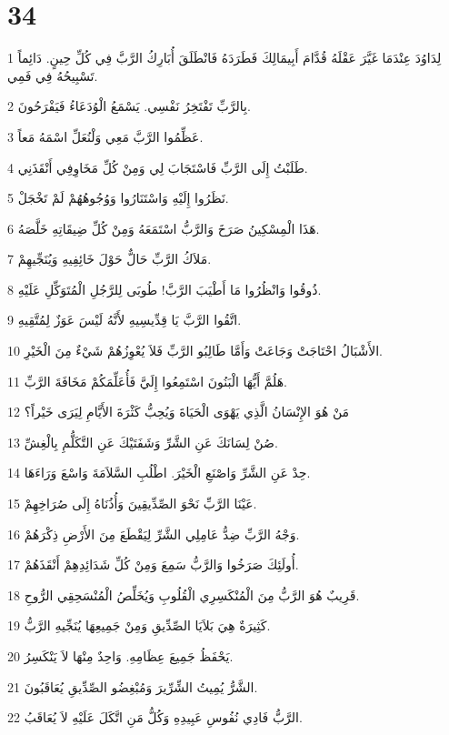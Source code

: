 \chapter{34}

\par 1 لِدَاوُدَ عِنْدَمَا غَيَّرَ عَقْلَهُ قُدَّامَ أَبِيمَالِكَ فَطَرَدَهُ فَانْطَلَقَ أُبَارِكُ الرَّبَّ فِي كُلِّ حِينٍ. دَائِماً تَسْبِيحُهُ فِي فَمِي.
\par 2 بِالرَّبِّ تَفْتَخِرُ نَفْسِي. يَسْمَعُ الْوُدَعَاءُ فَيَفْرَحُونَ.
\par 3 عَظِّمُوا الرَّبَّ مَعِي وَلْنُعَلِّ اسْمَهُ مَعاً.
\par 4 طَلَبْتُ إِلَى الرَّبِّ فَاسْتَجَابَ لِي وَمِنْ كُلِّ مَخَاوِفِي أَنْقَذَنِي.
\par 5 نَظَرُوا إِلَيْهِ وَاسْتَنَارُوا وَوُجُوهُهُمْ لَمْ تَخْجَلْ.
\par 6 هَذَا الْمِسْكِينُ صَرَخَ وَالرَّبُّ اسْتَمَعَهُ وَمِنْ كُلِّ ضِيقَاتِهِ خَلَّصَهُ.
\par 7 مَلاَكُ الرَّبِّ حَالٌّ حَوْلَ خَائِفِيهِ وَيُنَجِّيهِمْ.
\par 8 ذُوقُوا وَانْظُرُوا مَا أَطْيَبَ الرَّبَّ! طُوبَى لِلرَّجُلِ الْمُتَوَكِّلِ عَلَيْهِ.
\par 9 اتَّقُوا الرَّبَّ يَا قِدِّيسِيهِ لأَنَّهُ لَيْسَ عَوَزٌ لِمُتَّقِيهِ.
\par 10 الأَشْبَالُ احْتَاجَتْ وَجَاعَتْ وَأَمَّا طَالِبُو الرَّبِّ فَلاَ يُعْوِزُهُمْ شَيْءٌ مِنَ الْخَيْرِ.
\par 11 هَلُمَّ أَيُّهَا الْبَنُونَ اسْتَمِعُوا إِلَيَّ فَأُعَلِّمَكُمْ مَخَافَةَ الرَّبِّ.
\par 12 مَنْ هُوَ الإِنْسَانُ الَّذِي يَهْوَى الْحَيَاةَ وَيُحِبُّ كَثْرَةَ الأَيَّامِ لِيَرَى خَيْراً؟
\par 13 صُنْ لِسَانَكَ عَنِ الشَّرِّ وَشَفَتَيْكَ عَنِ التَّكَلُّمِ بِالْغِشِّ.
\par 14 حِدْ عَنِ الشَّرِّ وَاصْنَعِ الْخَيْرَ. اطْلُبِ السَّلاَمَةَ وَاسْعَ وَرَاءَهَا.
\par 15 عَيْنَا الرَّبِّ نَحْوَ الصِّدِّيقِينَ وَأُذُنَاهُ إِلَى صُرَاخِهِمْ.
\par 16 وَجْهُ الرَّبِّ ضِدُّ عَامِلِي الشَّرِّ لِيَقْطَعَ مِنَ الأَرْضِ ذِكْرَهُمْ.
\par 17 أُولَئِكَ صَرَخُوا وَالرَّبُّ سَمِعَ وَمِنْ كُلِّ شَدَائِدِهِمْ أَنْقَذَهُمْ.
\par 18 قَرِيبٌ هُوَ الرَّبُّ مِنَ الْمُنْكَسِرِي الْقُلُوبِ وَيُخَلِّصُ الْمُنْسَحِقِي الرُّوحِ.
\par 19 كَثِيرَةٌ هِيَ بَلاَيَا الصِّدِّيقِ وَمِنْ جَمِيعِهَا يُنَجِّيهِ الرَّبُّ.
\par 20 يَحْفَظُ جَمِيعَ عِظَامِهِ. وَاحِدٌ مِنْهَا لاَ يَنْكَسِرُ.
\par 21 الشَّرُّ يُمِيتُ الشِّرِّيرَ وَمُبْغِضُو الصِّدِّيقِ يُعَاقَبُونَ.
\par 22 الرَّبُّ فَادِي نُفُوسِ عَبِيدِهِ وَكُلُّ مَنِ اتَّكَلَ عَلَيْهِ لاَ يُعَاقَبُ.

